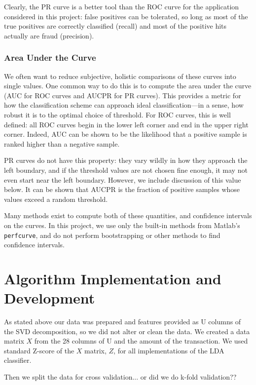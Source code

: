 \documentclass{article}
\begin{document}
Clearly, the PR curve is a better tool than the ROC curve for the application considered in this project: false positives can be tolerated, so long as most of the true positives are correctly classified (recall) and most of the positive hits actually are fraud (precision).

\subsubsection{Area Under the Curve}
We often want to reduce subjective, holistic comparisons of these curves into single values. One common way to do this is to compute the area under the curve (AUC for ROC curves and AUCPR for PR curves). This provides a metric for how  the classification scheme can approach ideal classification---in a sense, how robust it is to the optimal choice of threshold. For ROC curves, this is well defined: all ROC curves begin in the lower left corner and end in the upper right corner. Indeed, AUC can be shown to be the likelihood that a positive sample is ranked higher than a negative sample\cite{Fawcett}.

PR curves do not have this property: they vary wildly in how they approach the left boundary, and if the threshold values are not chosen fine enough, it may not even start near the left boundary. However, we include discussion of this value below. It can be shown that AUCPR is the fraction of positive samples whose values exceed a random threshold\cite{boyd}.

Many methods exist to compute both of these quantities, and confidence intervals on the curves\cite{boyd}\cite{fawcett}. In this project, we use only the built-in methods from Matlab's \texttt{perfcurve}, and do not perform bootstrapping or other methods to find confidence intervals.

\section{Algorithm Implementation and Development}

As stated above our data was prepared and features provided as U columns of the SVD decomposition, so we did not alter or clean the data.
We created a  data matrix $X$ from the 28 columns of U and the amount of the transaction.
We used standard Z-score of the $X$ matrix, $Z$, for all implementations of the LDA classifier.

Then we split the data for cross validation... or did we do k-fold validation??
\end{document}
